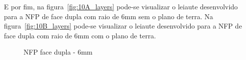 E por fim, na figura~\ref{fig:10A_layers} pode-se visualizar o leiaute desenvolvido para a NFP de face dupla com raio de 6mm sem o plano de terra. Na figura~\ref{fig:10B_layers} pode-se visualizar o leiaute desenvolvido para a NFP de face dupla com raio de 6mm com o plano de terra. 
\begin{figure}[htb!]
	\centering
 	\caption{NFP face dupla - 6mm}
	\subfloat[][FD60CT]{
}
\end{figure}
